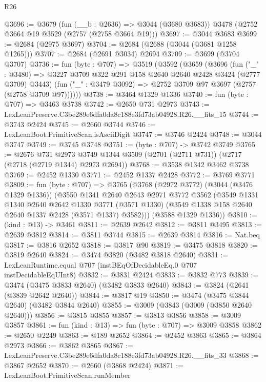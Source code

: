 \begin{lexlean}{R26}
\begin{coremodule}
@3696 := @3679
    (fun (__b : @2636) => @3044 (@3680 @3683))
    @3478
    (@2752 @3664 @19 @3529 (@2757 (@2758 @3664 @19)))
@3697 := @3044 @3683
@3699 := @2684 (@2975 @3697)
@3704 := @2684 (@2688 (@3044 (@3681 @1258 @1265)))
@3707 := @2684 (@2691 @3034) @2694
@3709 := @3699 (@3704 @3707)
@3736 := fun (byte : @707) =>
  @3519
    (@3592
      (@3659
        (@3696
          (fun ("_" : @3480) =>
          @3227 @3709 @322 @291 @158 @2640 @2640 @2428 @3424 (@2777 @3709) @3443)
          (fun ("_" : @3479 @3092) => @2752 @3709 @97 @3697 (@2757 (@2758 @3709 @97))))))
@3738 := @3464 @1329 @1336
@3740 := fun (byte : @707) => @3463 @3738
@3742 := @2650 @731 @2973
@3743 := LexLeanPreserve.C3be289e6dfa0da8c188e3fd73ab04928.R26.__fits_15
@3744 := @3743 @2424
@3745 := @2660 @3744
@3746 := LexLeanBoot.PrimitiveScan.isAsciiDigit
@3747 := @3746 @2424
@3748 := @3044 @3747
@3749 := @3745 @3748
@3751 := (byte : @707) -> @3742 @3749
@3765 := @2676
    @731
    @2973
    @3749
    @1344
    @3509
    (@2701 (@2711 @731))
    (@2717 (@2718 (@2719 @1344) @2973 @2694))
@3768 := @3538 @1342 @3462 @3738
@3769 := @2452 @1330
@3771 := @2452 @1337 @2428
@3772 := @3769 @3771
@3809 := fun (byte : @707) =>
  @3765
    (@3768
      (@2972 @3772)
      (@3044 (@3476 @1329 @1336))
      (@3550
        @1341
        @2640
        @2643
        @2971
        @3772
        @3562
        (@3549
          @1331
          @1340
          @2640
          @2642
          @1330
          @3771
          (@3571 @1330)
          (@3549 @1338 @158 @2640 @2640 @1337 @2428 (@3571 @1337) @3582)))
      (@3588 @1329 @1336))
@3810 := (kind : @13) -> @3461
@3811 := @2639 @2642
@3812 := @3811 @3495
@3813 := @2639 @3812
@3814 := @3811 @3744
@3815 := @2639 @3814
@3816 := Nat.beq
@3817 := @3816 @2652
@3818 := @3817 @90
@3819 := @3475 @3818
@3820 := @3819 @2640
@3824 := @3474 @3820 (@3482 @3818 @2640)
@3831 := LexLeanRuntime.equal @707 (instBEqOfDecidableEq.{0} @707 instDecidableEqUInt8)
@3832 := @3831 @2424
@3833 := @3832 @773
@3839 := @3474 (@3475 @3833 @2640) (@3482 @3833 @2640)
@3843 := @3824 (@2641 (@3839 @2642 @2640))
@3844 := @3817 @19
@3850 := @3474 (@3475 @3844 @2640) (@3482 @3844 @2640)
@3855 := @3009 (@3843 (@3009 (@3850 @2640 @2640)))
@3856 := @3815 @3855
@3857 := @3813 @3856
@3858 := @3009 @3857
@3861 := fun (kind : @13) => fun (byte : @707) => @3009 @3858
@3862 := @2650 @2249
@3863 := @189 @2652
@3864 := @2452 @3863
@3865 := @3864 @2973
@3866 := @3862 @3865
@3867 := LexLeanPreserve.C3be289e6dfa0da8c188e3fd73ab04928.R26.__fits_33
@3868 := @3867 @2652
@3870 := @2660 (@3868 @2424)
@3871 := LexLeanBoot.PrimitiveScan.runMember

\end{coremodule}
\end{lexlean}
